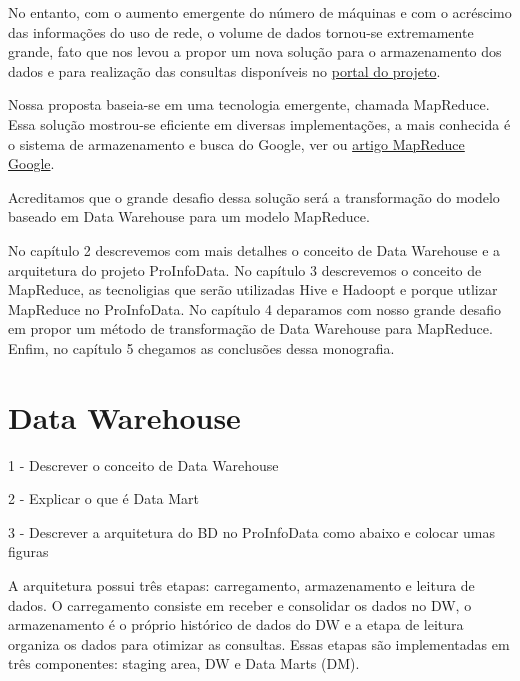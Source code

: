 \documentclass[a4paper,12pt]{article}
\begin{document}
No entanto, com o aumento emergente do número de máquinas e com o acréscimo das
informações do uso de rede, o volume de dados tornou-se extremamente grande, fato que 
nos levou a propor um nova solução para o armazenamento dos dados e para realização
das consultas disponíveis no \href {http://seed.c3sl.ufpr.br/seed/attendance/index.html}
{portal do projeto}.

Nossa proposta baseia-se em uma tecnologia emergente, chamada MapReduce. Essa solução 
mostrou-se eficiente em diversas implementações, a mais conhecida é o sistema de 
armazenamento e busca do Google, ver \cite{MapReduceGoogle} ou
\href {http://labs.google.com/papers/mapreduce.html} {artigo MapReduce Google}.

Acreditamos que o grande desafio dessa solução será a transformação do modelo baseado 
em Data Warehouse para um modelo MapReduce.

No capítulo 2 descrevemos com mais detalhes o conceito de Data Warehouse e a arquitetura
do projeto ProInfoData. No capítulo 3 descrevemos o conceito de MapReduce, as 
tecnoligias que serão utilizadas Hive e Hadoopt e porque utlizar MapReduce no 
ProInfoData. No capítulo 4 deparamos com nosso grande desafio em propor um método de 
transformação de Data Warehouse para MapReduce. Enfim, no capítulo 5 chegamos as
conclusões dessa monografia.

\section{\textbf{Data Warehouse}}

1 - Descrever o conceito de Data Warehouse

2 - Explicar o que é Data Mart 

3 - Descrever a arquitetura do BD no ProInfoData como abaixo e colocar umas figuras

A arquitetura possui três etapas: carregamento, armazenamento e leitura de dados.
O carregamento consiste em receber e consolidar os dados no DW, o armazenamento é o
próprio histórico de dados do DW e a etapa de leitura organiza os dados para otimizar 
as consultas. Essas etapas são implementadas em três componentes: staging area,
DW e Data Marts (DM).
\end{document}
